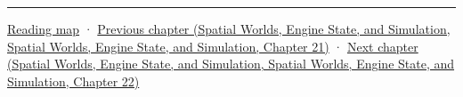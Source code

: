 \begin{center}\rule{0.5\linewidth}{0.5pt}\end{center}

\hyperref[volume-reading-map]{Reading map} · \href{../05-Spatial-Worlds-Engine-State-and-Simulation/main.pdf\#nameddest=06-engine-ii-ch031-spatial-index-serialization-and-query-evidence}{Previous chapter (Spatial Worlds, Engine State, and Simulation, Spatial Worlds, Engine State, and Simulation, Chapter 21)} · \href{../05-Spatial-Worlds-Engine-State-and-Simulation/main.pdf\#nameddest=06-engine-ii-ch033-versioned-scenes-and-transactional-loading}{Next chapter (Spatial Worlds, Engine State, and Simulation, Spatial Worlds, Engine State, and Simulation, Chapter 22)}
